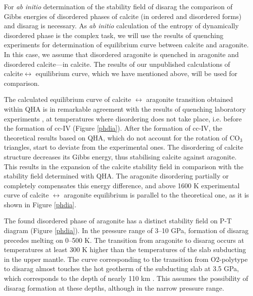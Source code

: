\documentclass[journal=jacsat,manuscript=article]{achemso}
\begin{document}
For {\it ab initio} determination of the stability field of disarag the comparison of Gibbs energies of disordered phases of calcite (in ordered and disordered forms) and disarag is necessary.
As {\it ab initio} calculation of the entropy of dynamically disordered phase is the complex task, we will use the results of quenching experiments for determination of equilibrium curve between calcite and aragonite.
In this case, we assume that disordered aragonite is quenched in aragonite and disordered calcite---in calcite.
The results of our unpublished calculations of calcite$\leftrightarrow$ equilibrium curve, which we have mentioned above, will be used for comparison.

The calculated equilibrium curve of calcite $\leftrightarrow$ aragonite transition obtained within QHA is in remarkable agreement with the results of quenching laboratory experiments \cite{shatskiy2018, fedoraeva2019}, at temperatures where disordering does not take place, i.e. before the formation of cc-IV (Figure \ref{phdia}). 
After the formation of cc-IV, the theoretical results based on QHA, which do not account for the rotation of CO$_3$ triangles, start to deviate from the experimental ones. 
The disordering of calcite structure decreases its Gibbs energy, thus stabilising calcite against aragonite. 
This results in the expansion of the calcite stability field in comparison with the stability field determined with QHA.
The aragonite disordering partially or completely compensates this energy difference, and above 1600 K experimental curve of calcite $\leftrightarrow$ aragonite equilibrium is parallel to the theoretical one, as it is shown in Figure \ref{phdia}.

The found disordered phase of aragonite has a distinct stability field on P-T diagram (Figure \ref{phdia}). 
In the pressure range of 3--10 GPa, formation of disarag precedes melting on 0--500 K. 
The transition from aragonite to disarag occurs at temperatures at least 300 K higher than the temperatures of the slab subducting in the upper mantle.
The curve corresponding to the transition from O2-polytype to disarag almost touches the hot geotherm of the subducting slab at 3.5 GPa, which corresponds to the depth of nearly 110 km \cite{syracuse2010}.
This assumes the possibility of disarag formation at these depths, although in the narrow pressure range.
\end{document}
